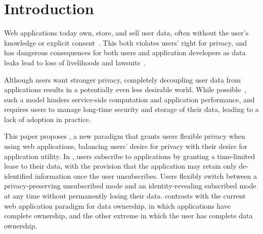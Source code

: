 \section{Introduction}
%
%
Web applications today own, store, and sell user data, often without the user's knowledge or
explicit consent~\cite{nytimes:fb, npr:data, breach:flo}. This both violates users' right for privacy, and has
dangerous consequences for both users and application developers as data leaks lead to loss of
livelihoods and lawsuits~\cite{breach:amazon,breach:twitter, breach:fb, breach:marriott,
breach:quora}. 

Although users want stronger privacy, completely decoupling user data from applications results in a
potentially even less desirable world. While possible~\cite{solid, amber, w5, blockstack, bstore}, such a
model hinders service-side computation and application performance, and requires users to manage
long-time security and storage of their data, leading to a lack of adoption in practice.  

This paper proposes \name, a new paradigm that grants users flexible privacy when using web
applications, balancing users' desire for privacy with their desire for application utility. In
\name, users subscribe to applications by granting a time-limited lease to their data, with the
provision that the application may retain only de-identified information once the user unsubscribes.
Users flexibly switch between a privacy-preserving unsubscribed mode and an identity-revealing
subscribed mode at any time without permanently losing their data. \name contrasts
with the current web application paradigm for data ownership, in which applications have complete
ownership, and the other extreme in which the user has complete data ownership.%

